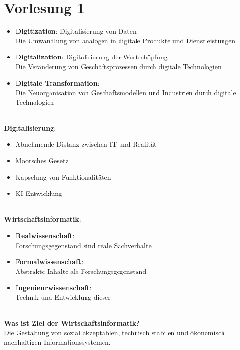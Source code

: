 \documentclass[a4]{scrartcl}
\begin{document}
\section*{Vorlesung 1}

\begin{itemize}
    \item \textbf{Digitization}: Digitalisierung von Daten \\
    Die Umwandlung von analogen in digitale Produkte und Dienstleistungen
    \item \textbf{Digitalization}: Digitalisierung der Wertschöpfung \\
    Die Veränderung von Geschäftsprozessen durch digitale Technologien
    \item \textbf{Digitale Transformation}: \\
    Die Neuorganisation von Geschäftsmodellen und Industrien durch digitale Technologien
\end{itemize}

\ \\
\textbf{Digitalisierung}:
\begin{itemize}
    \item Abnehmende Distanz zwischen IT und Realität
    \item Moorsches Gesetz
    \item Kapselung von Funktionalitäten
    \item KI-Entwicklung 
\end{itemize}

\ \\
\textbf{Wirtschaftsinformatik}:

\begin{itemize}
    \item \textbf{Realwissenschaft}: \\
    Forschungsgegenstand sind reale Sachverhalte
    \item \textbf{Formalwissenschaft}: \\
    Abstrakte Inhalte als Forschungsgegenstand
    \item \textbf{Ingenieurwissenschaft}: \\
    Technik und Entwicklung dieser
\end{itemize}
 
 \ \\
\textbf{ Was ist Ziel der Wirtschaftsinformatik? }\\
 Die Gestaltung von sozial akzeptablen, technisch stabilen und ökonomisch nachhaltigen Informationssystemen.
\end{document}
